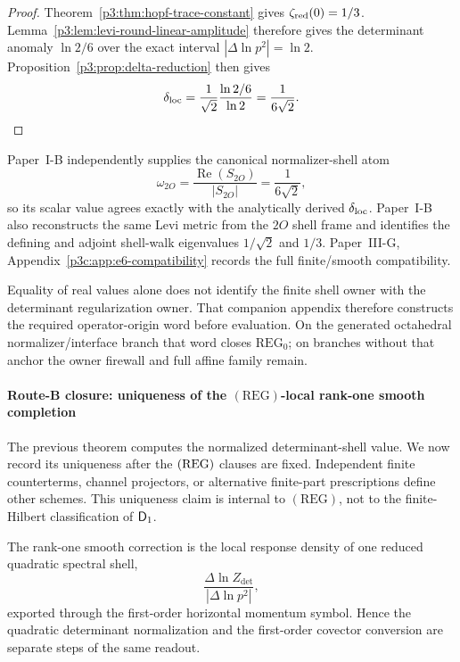 \documentclass[12pt,a4paper]{article}
\begin{document}
\begin{proof}
Theorem~\ref{p3:thm:hopf-trace-constant} gives
\(\zeta_{\rm red}(0)=1/3\).  Lemma~\ref{p3:lem:levi-round-linear-amplitude}
therefore gives the determinant anomaly \(\ln2/6\) over the exact interval
\(|\Delta\ln p^2|=\ln2\).  Proposition~\ref{p3:prop:delta-reduction} then gives
\[
 \delta_{\rm loc}
 =\frac1{\sqrt2}\frac{\ln2/6}{\ln2}
 =\frac1{6\sqrt2}.
\]
\end{proof}
\begin{remark}
\label{p3:rem:2O-shell-match-owner-firewall}
Paper~I-B independently supplies the canonical normalizer-shell atom
\[
 \omega_{2O}
 =\frac{\operatorname{Re}(S_{2O})}{|S_{2O}|}
 =\frac1{6\sqrt2},
\]
so its scalar value agrees exactly with the analytically derived
\(\delta_{\rm loc}\).  Paper~I-B also reconstructs the same Levi metric from
the \(2O\) shell frame and identifies the defining and adjoint shell-walk
eigenvalues \(1/\sqrt2\) and \(1/3\).
Paper~III-G, Appendix~\ref{p3c:app:e6-compatibility} records the full finite/smooth
compatibility.

Equality of real values alone does not identify the finite shell owner with
the determinant regularization owner.  That companion appendix therefore constructs the
required operator-origin word before evaluation.  On the generated
octahedral normalizer/interface branch that word closes
\(\mathrm{REG}_0\); on branches without that anchor the owner firewall and
full affine family remain.
\end{remark}

\paragraph{Route-B closure: uniqueness of the \texorpdfstring{$(\mathrm{REG})$}{REG}-local rank-one smooth completion}
\label{p3:sssec:D1-local-delta-closure}

The previous theorem computes the normalized determinant-shell value.  We now
record its uniqueness after the \(({\rm REG})\) clauses are fixed.  Independent
finite counterterms, channel projectors, or alternative finite-part
prescriptions define other schemes.  This uniqueness claim is internal to
\((\mathrm{REG})\), not to the finite-Hilbert classification of \(\mathsf{D}_1\).

\begin{definition}
\label{p3:def:first-order-contact-shell-germ}
The rank-one smooth correction is the local response density of one reduced
quadratic spectral shell,
\[
 \frac{\Delta\ln Z_{\det}}{|\Delta\ln p^2|},
\]
exported through the first-order horizontal momentum symbol.  Hence the
quadratic determinant normalization and the first-order covector conversion are
separate steps of the same readout.
\end{definition}
\end{document}
